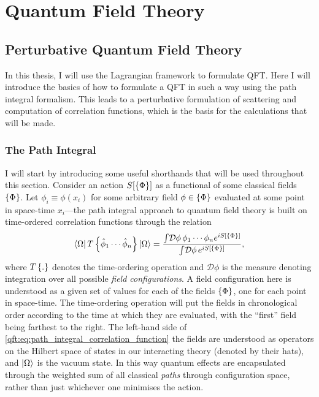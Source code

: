 \documentclass[../main.tex]{subfiles}
\begin{document}
\chapter{Quantum Field Theory}





\section{Perturbative Quantum Field Theory}
In this thesis, I will use the Lagrangian framework to formulate QFT\@.
Here I will introduce the basics of how to formulate a QFT in such a way using the path integral formalism.
This leads to a perturbative formulation of scattering and computation of correlation functions, which is the basis for the calculations that will be made. \medskip



\subsection{The Path Integral}
I will start by introducing some useful shorthands that will be used throughout this section.
Consider an action \(S[\left\{\Phi\right\}]\) as a functional of some classical fields \(\left\{\Phi\right\}\). Let \(\phi_i \equiv \phi(x_i)\) for some arbitrary field \(\phi \in \left\{\Phi\right\}\) evaluated at some point in space-time \(x_i\)---the path integral approach to quantum field theory is built on time-ordered correlation functions through the relation\needcite\
\begin{equation}
  \label{qft:eq:path_integral_correlation_function}
  \left\langle \Omega \right| T\left\{\hat\phi_1 \cdots \hat\phi_n\right\} \left| \Omega \right\rangle = \frac{\int\!\mathcal{D}\phi\, \phi_1 \cdots \phi_n e^{iS[\left\{\Phi\right\}]}}{\int\!\mathcal{D}\phi\, e^{iS[\left\{\Phi\right\}]}},
\end{equation}
where \(T\left\{.\right\}\) denotes the time-ordering operation and \(\mathcal{D}\phi\) is the measure denoting integration over all possible \emph{field configurations}.
A field configuration here is understood as a given set of values for each of the fields \(\left\{\Phi\right\}\), one for each point in space-time.
The time-ordering operation will put the fields in chronological order according to the time at which they are evaluated, with the ``first'' field being farthest to the right.
The left-hand side of \cref{qft:eq:path_integral_correlation_function} the fields are understood as operators on the Hilbert space of states in our interacting theory (denoted by their hats), and \(\left| \Omega \right\rangle\) is the vacuum state.
In this way quantum effects are encapsulated through the weighted sum of all classical \emph{paths} through configuration space, rather than just whichever one minimises the action.
\end{document}
